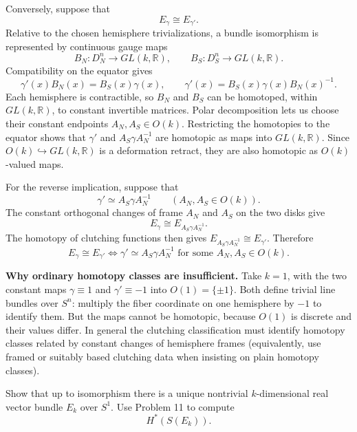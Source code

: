 \begin{solution}
Conversely, suppose that
\[
E_{\gamma}\cong E_{\gamma'}.
\]
Relative to the chosen hemisphere trivializations, a bundle isomorphism is represented by continuous gauge maps
\[
B_N:D_N^n\to GL(k,\mathbb R),
\qquad
B_S:D_S^n\to GL(k,\mathbb R).
\]
Compatibility on the equator gives
\[
\gamma'(x)B_N(x)=B_S(x)\gamma(x),
\qquad
\gamma'(x)=B_S(x)\gamma(x)B_N(x)^{-1}.
\]
Each hemisphere is contractible, so \(B_N\) and \(B_S\) can be homotoped, within \(GL(k,\mathbb R)\), to constant invertible matrices. Polar decomposition lets us choose their constant endpoints \(A_N,A_S\in O(k)\). Restricting the homotopies to the equator shows that \(\gamma'\) and \(A_S\gamma A_N^{-1}\) are homotopic as maps into \(GL(k,\mathbb R)\). Since \(O(k)\hookrightarrow GL(k,\mathbb R)\) is a deformation retract, they are also homotopic as \(O(k)\)-valued maps.

For the reverse implication, suppose that
\[
\gamma'\simeq A_S\gamma A_N^{-1}
\qquad(A_N,A_S\in O(k)).
\]
The constant orthogonal changes of frame \(A_N\) and \(A_S\) on the two disks give
\[
E_{\gamma}\cong E_{A_S\gamma A_N^{-1}}.
\]
The homotopy of clutching functions then gives
\(E_{A_S\gamma A_N^{-1}}\cong E_{\gamma'}\). Therefore
\[
\boxed{E_{\gamma}\cong E_{\gamma'}
\iff \gamma'\simeq A_S\gamma A_N^{-1}
\text{ for some }A_N,A_S\in O(k).}
\]

\textbf{Why ordinary homotopy classes are insufficient.}
Take \(k=1\), with the two constant maps \(\gamma\equiv 1\) and \(\gamma'\equiv-1\) into \(O(1)=\{\pm1\}\). Both define trivial line bundles over \(S^n\): multiply the fiber coordinate on one hemisphere by \(-1\) to identify them. But the maps cannot be homotopic, because \(O(1)\) is discrete and their values differ. In general the clutching classification must identify homotopy classes related by constant changes of hemisphere frames (equivalently, use framed or suitably based clutching data when insisting on plain homotopy classes).
\end{solution}

\begin{problem}
Show that up to isomorphism there is a unique nontrivial \(k\)-dimensional real vector bundle \(E_k\) over \(S^1\). Use Problem 11 to compute
\[
H^*(S(E_k)).
\]
\end{problem}

